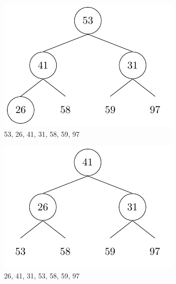 \begin{center}
\begin{minipage}{0.32\textwidth}
  \begin{figure}[H]
    \centering
    \includegraphics[width=\textwidth]{Figure/HeapSort4.pdf}
    \caption*{53, 26, 41, 31, 58, 59, 97}
  \end{figure}
\end{minipage}
\begin{minipage}{0.32\textwidth}
  \begin{figure}[H]
    \centering
    \includegraphics[width=\textwidth]{Figure/HeapSort5.pdf}
    \caption*{26, 41, 31, 53, 58, 59, 97}
  \end{figure}
\end{minipage}

\end{center}
